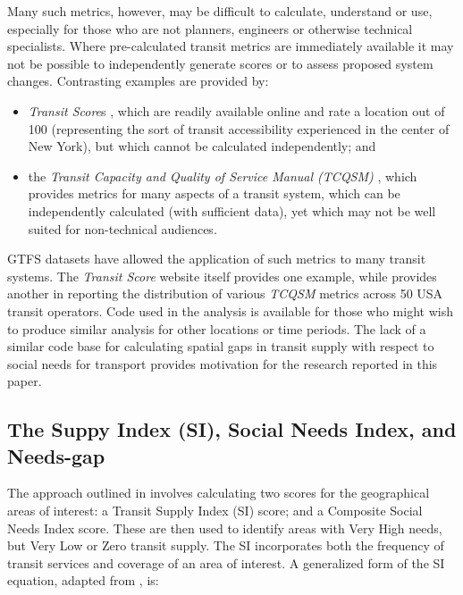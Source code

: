 \documentclass[preprint, 3p,
authoryear]{elsarticle} %
\begin{document}
Many such metrics, however, may be difficult to calculate, understand or
use, especially for those who are not planners, engineers or otherwise
technical specialists. Where pre-calculated transit metrics are
immediately available it may not be possible to independently generate
scores or to assess proposed system changes. Contrasting examples are
provided by:

\begin{itemize}
\item
  \emph{Transit Score}s \citep{WalkScore:2023tg}, which are readily
  available online and rate a location out of 100 (representing the sort
  of transit accessibility experienced in the center of New York), but
  which cannot be calculated independently; and
\item
  the \emph{Transit Capacity and Quality of Service Manual (TCQSM)}
  \citep{TCQSM:2013}, which provides metrics for many aspects of a
  transit system, which can be independently calculated (with sufficient
  data), yet which may not be well suited for non-technical audiences.
\end{itemize}

GTFS datasets have allowed the application of such metrics to many
transit systems. The \emph{Transit Score} website itself provides one
example, while \citet{Wong:2013aa} provides another in reporting the
distribution of various \emph{TCQSM} metrics across 50 USA transit
operators. Code used in the \citet{Wong:2013aa} analysis is available
for those who might wish to produce similar analysis for other locations
or time periods. The lack of a similar code base for calculating spatial
gaps in transit supply with respect to social needs for transport
provides motivation for the research reported in this paper.

\subsection{The Suppy Index (SI), Social Needs Index, and
Needs-gap}\label{the-suppy-index-si-social-needs-index-and-needs-gap}

The approach outlined in \citet{currie2010identifying} involves
calculating two scores for the geographical areas of interest: a Transit
Supply Index (SI) score; and a Composite Social Needs Index score. These
are then used to identify areas with Very High needs, but Very Low or
Zero transit supply. The SI incorporates both the frequency of transit
services and coverage of an area of interest. A generalized form of the
SI equation, adapted from \citet{currie2010identifying}, is:
\end{document}
